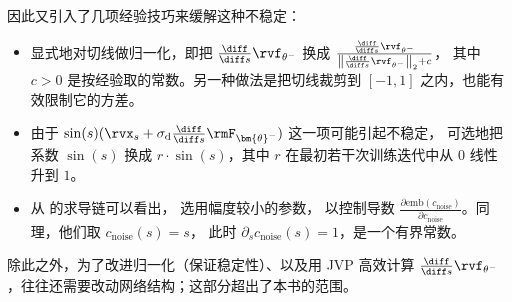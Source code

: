 因此又引入了几项经验技巧来缓解这种不稳定：
\begin{itemize}
    \item {} 显式地对切线做归一化，即把 $\frac{\diff }{\diff s}\rvf_{\theta^-}$ 换成
    $    \frac{\frac{\diff }{\diff s} \rvf_{\theta^-}}{\left\| \frac{\diff }{\diff s} \rvf_{\theta^-} \right\|_2 + c}$，
    其中 $c>0$ 是按经验取的常数。另一种做法是把切线裁剪到 $[-1, 1]$ 之内，也能有效限制它的方差。
    \item {} 由于 $\sin(s)(\rvx_s + \sigma_{\mathrm{d}} \frac{\diff }{\diff s}\rmF_{\bm{\theta}^-})$ 这一项可能引起不稳定，
    可选地把系数 $\sin(s)$ 换成 $r \cdot \sin(s)$，其中 $r$ 在最初若干次训练迭代中从 $0$ 线性升到 $1$。
    \item {} 从  的求导链可以看出，\citet{lu2024simplifying} 选用幅度较小的参数，
    以控制导数 $\frac{\partial \text{emb}(c_{\mathrm{noise}})}{\partial c_{\mathrm{noise}}}$。同理，他们取 $c_{\mathrm{noise}}(s) = s$，
    此时 $\partial_s c_{\mathrm{noise}}(s)=1$，是一个有界常数。
\end{itemize}
除此之外，为了改进归一化（保证稳定性）、以及用 JVP 高效计算 $\frac{\diff}{\diff s}\rvf_{\theta^-}$，往往还需要改动网络结构；这部分超出了本书的范围。

